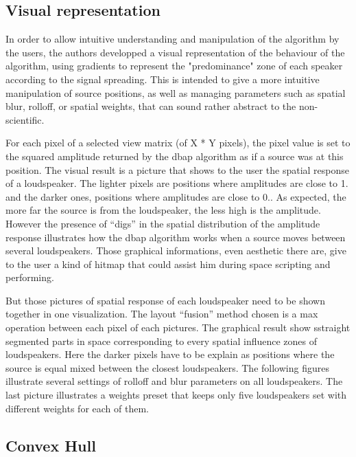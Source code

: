 \documentclass[twoside,10pt]{article}
\begin{document}
\subsection{Visual representation}

In order to allow intuitive understanding and manipulation of the algorithm by the users, the authors developped a visual representation of the behaviour of the algorithm, using gradients to represent the "predominance" zone of each speaker according to the signal spreading. This is intended to give a more intuitive manipulation of source positions, as well as managing parameters such as spatial blur, rolloff, or spatial weights, that can sound rather abstract to the non-scientific.


For each pixel of a selected view matrix (of X * Y pixels), the pixel value is set to the  squared amplitude returned by the dbap algorithm as if a source was at this position. The visual result is a picture that shows to the user the spatial response of  a loudspeaker. The lighter pixels are positions where amplitudes are close to 1. and the darker ones, positions where amplitudes are close to 0.. As expected, the more far the source is from the loudspeaker, the less high is the amplitude. However the presence of “digs” in the spatial distribution of the amplitude response illustrates how the dbap algorithm works when a source moves between several loudspeakers. Those graphical informations, even aesthetic there are, give to the user a kind of hitmap that could assist him during space scripting and performing.


But those pictures of spatial response of each loudspeaker need to be shown together in one visualization. The layout “fusion” method chosen is a max operation between each pixel of each pictures. The graphical result show sstraight segmented parts in space corresponding to every spatial influence zones of loudspeakers. Here the darker pixels have to be explain as positions where the source is equal mixed between the closest loudspeakers. The following figures illustrate several settings of rolloff and blur parameters on all loudspeakers. The last picture illustrates a weights preset that keeps only five loudspeakers set with different weights for each of them.


\subsection{Convex Hull}
\end{document}
